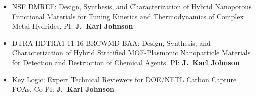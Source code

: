\begin{itemize}
	\item NSF DMREF: Design, Synthesis, and Characterization of Hybrid Nanoporous Functional Materials for Tuning Kinetics and Thermodynamics of Complex Metal Hydrides.  PI: \textbf{J.\ Karl Johnson}

	\item DTRA HDTRA1-11-16-BRCWMD-BAA: Design, Synthesis, and Characterization of Hybrid Stratified MOF-Plasmonic Nanoparticle Materials for Detection and Destruction of Chemical Agents.  PI: \textbf{J.\ Karl Johnson}

	\item Key Logic: Expert Technical Reviewers for DOE/NETL Carbon Capture FOAs. Co-PI: \textbf{J.\ Karl Johnson}

\end{itemize}


